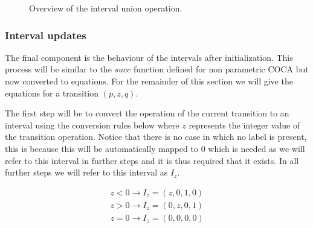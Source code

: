 \documentclass[12pt]{article}
\begin{document}
\begin{figure}
	\caption{Overview of the interval union operation.}
	\label{fig:union}
\end{figure}
\subsubsection{Interval updates}
The final component is the behaviour of the intervals after initialization. This process will be similar to the $succ$ function defined for non parametric COCA but now converted to equations. For the remainder of this section we will give the equations for a transition $(p, z, q)$.

The first step will be to convert the operation of the current transition to an interval using the conversion rules below where $z$ represents the integer value of the transition operation. Notice that there is no case in which no label is present, this is because this will be automatically mapped to 0 which is needed as we will refer to this interval in further steps and it is thus required that it exists. In all further steps we will refer to this interval as $I_z$.

\begin{gather*}
	z < 0 \rightarrow I_z = (z, 0, 1, 0) \\
	z > 0 \rightarrow  I_z = (0, z, 0, 1) \\
	z = 0 \rightarrow I_z = (0, 0, 0, 0) 
\end{gather*}
\end{document}
